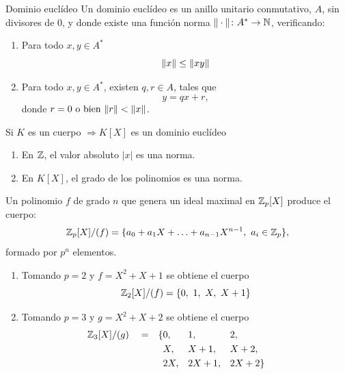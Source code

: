 \documentclass[10pt,t]{beamer}
\begin{document}
\begin{frame}
    \begin{block}{\centering \large Dominio euclídeo}
        Un dominio euclídeo es un anillo unitario conmutativo, $A$, sin divisores de 0, y donde existe una función norma $\|\cdot\| \colon A^* \to \mathbb{N}$, verificando:
        \begin{enumerate}[label=\roman*)]
            \item Para todo $x,y\in A^*$ \[\|x\| \leq\|xy\|\]
            \item Para todo $x,y \in A^*$, existen $q,r \in A$, tales que 
                \[y = qx + r,\]
                donde $r = 0 \text{ o bien } \|r\| < \|x\|$.
        \end{enumerate}
    \end{block}

    \begin{prop}
        \centering Si $K$ es un cuerpo $\Longrightarrow K[X]$ es un dominio euclídeo 
    \end{prop}

    \begin{plainexample}
        \begin{enumerate}[label=--]
            \item En $\mathbb{Z}$, el valor absoluto $|x|$ es una norma.
            \item En $K[X]$, el grado de los polinomios es una norma.
        \end{enumerate}
    \end{plainexample}
\end{frame}

\begin{frame}
    \begin{prop}
        Un polinomio $f$ de grado $n$ que genera un ideal maximal en $\mathbb{Z}_p[X]$ produce el cuerpo:
        \[ \mathbb{Z}_p[X]/(f) = \{a_0 + a_1X +  \ldots + a_{n-1}X^{n-1} , \  a_i \in \mathbb{Z}_p\},\]
        formado por $p^n$ elementos.
    \end{prop}

    \begin{plainexample}
        \begin{enumerate}[label=--]
            \item Tomando $p = 2$ y $f = X^2+X+1$ se obtiene el cuerpo
            \[\Z_2[X]/(f) = \{0,\ 1,\ X,\ X+1\}\]
            \item Tomando $p = 3$ y $g = X^2 + X + 2$ se obtiene el cuerpo
            \begin{align*}
                \mathbb{Z}_3[X]/(g) \quad = &&\{  &0   ,&& 1   ,&& 2  ,   &&&&\\
                &&    &   X,&& X+1 ,&& X+2,   &&&&\\
                &&    &  2X,&& 2X+1,&& 2X+2\} &&&&
            \end{align*}
        \end{enumerate}
    \end{plainexample}
\end{frame}
\end{document}
